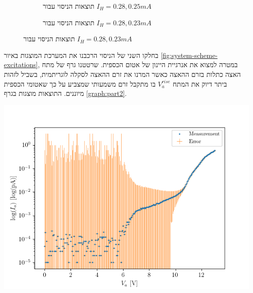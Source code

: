 \documentclass{article}
\begin{document}
\begin{figure}[H]
    \begin{subfigure}[b]{\textwidth}
    	\centering
	\resizebox{0.95\textwidth}{!}{}
    	\caption{תוצאות הניסוי עבור 
    	$I_H =0.28,0.25 mA$}
    	\label{fig:Changing_Ih_25-28mA}
    \end{subfigure}
    \hfill
    \begin{subfigure}[b]{\textwidth}
    	\centering
    	\resizebox{0.95\textwidth}{!}{}
    	\caption{תוצאות הניסוי עבור 
    	$I_H =0.28,0.23 mA$}
    	\label{fig:Changing_Ih_23-28mA}
    \end{subfigure}
\end{figure}


בחלקו השני של הניסוי הרכבנו את המערכת המוצגות באיור
\ref{fig:system-scheme-excitations}, 
במטרה למצוא את אנרגיית היינון של אטום הכספית.
שרטטנו גרף של מתח האצה כתלות בזרם ההאצה כאשר המרנו את זרם ההאצה לסקלה לוגריתמית, בשביל לזהות ביתר דיוק את המתח
$V_a^{rise}$
בו מתקבל זרם משמעותי שמצביע על כך שאטומי הכספית מיוננים. התוצאות מוצגות בגרף
\ref{graph:part2}.

\begin{graph}[H]
	\begin{center}
	 \includegraphics[width=\textwidth]{partTwo.png}
	\end{center}
	\caption{תוצאות יינון אטומי כספית}
	\label{graph:part2}
\end{graph}
\end{document}
